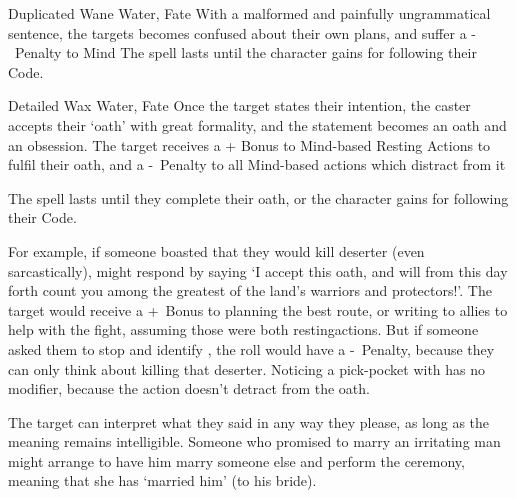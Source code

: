 \ifodd\value{diceNo}

  {Duplicated}%
  {Wane}%
  {Water, Fate}%
  {}%
  {With a malformed and painfully ungrammatical sentence, the targets becomes confused about their own plans, and suffer a -~Penalty to Mind }%
  {The spell lasts until the character gains  for following their Code.}

\else

  {Detailed}%
  {Wax}%
  {Water, Fate}%
  {}%
  {Once the target states their intention, the caster accepts their `oath' with great formality, and the statement becomes an oath and an obsession.
  The target receives a + Bonus to Mind-based Resting Actions to fulfil their oath, and a -~Penalty to all Mind-based actions which distract from it}%
  {The spell lasts until they complete their oath, or the character gains  for following their Code.

  For example, if someone boasted that they would kill  deserter (even sarcastically),  might respond by saying `I accept this oath, and will from this day forth count you among the greatest of the land's warriors and protectors!'.
  The target would receive a +~Bonus to planning the best route, or writing to allies to help with the fight, assuming those were both \glspl{restingaction}.
  But if someone asked them to stop and identify , the roll would have a -~Penalty, because they can only think about killing that deserter.
  Noticing a pick-pocket with  has no modifier, because the \gls{action} doesn't detract from the oath.

  The target can interpret what they said in any way they please, as long as the meaning remains intelligible.
  Someone who promised to marry an irritating man might arrange to have him marry someone else and perform the ceremony, meaning that she has `married him' (to his bride).}

\fi
{}
